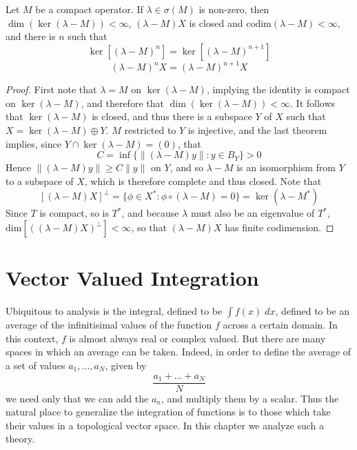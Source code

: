 \begin{corollary}
    Let $M$ be a compact operator. If $\lambda \in \sigma(M)$ is non-zero, then $\dim(\ker(\lambda - M)) < \infty$, $(\lambda - M)X$ is closed and $\text{codim}(\lambda - M) < \infty$, and there is $n$ such that
    \[ \ker[(\lambda - M)^n] = \ker[(\lambda - M)^{n+1}] \]
    \[ (\lambda - M)^n X = (\lambda - M)^{n+1} X \]
\end{corollary}
\begin{proof}
    First note that $\lambda = M$ on $\ker(\lambda - M)$, implying the identity is compact on $\ker(\lambda - M)$, and therefore that $\dim(\ker(\lambda - M)) < \infty$. It follows that $\ker(\lambda - M)$ is closed, and thus there is a subspace $Y$ of $X$ such that $X = \ker(\lambda - M) \oplus Y$. $M$ restricted to $Y$ is injective, and the last theorem implies, since $Y \cap \ker(\lambda - M) = (0)$, that
    \[ C = \inf \{ \| (\lambda - M)y \| : y \in B_Y \} > 0 \]
    Hence $\| (\lambda - M)y \| \geq C \|y\|$ on $Y$, and so $\lambda - M$ is an isomorphism from $Y$ to a subspace of $X$, which is therefore complete and thus closed. Note that
    \[ [(\lambda - M)X]^\perp = \{ \phi \in X^*: \phi \circ (\lambda - M) = 0 \} = \ker( \lambda - M^*) \]
    Since $T$ is compact, so is $T^*$, and because $\lambda$ must also be an eigenvalue of $T^*$, $\text{dim}[((\lambda - M)X)^\perp] < \infty$, so that $(\lambda - M)X$ has finite codimension.
\end{proof}























\chapter{Vector Valued Integration}

Ubiquitous to analysis is the integral, defined to be $\int f(x)\; dx$, defined to be an average of the infinitisimal values of the function $f$ across a certain domain. In this context, $f$ is almost always real or complex valued. But there are many spaces in which an average can be taken. Indeed, in order to define the average of a set of values $a_1, \dots, a_N$, given by
%
\[ \frac{a_1 + \dots + a_N}{N} \]
%
we need only that we can add the $a_n$, and multiply them by a scalar. Thus the natural place to generalize the integration of functions is to those which take their values in a topological vector space. In this chapter we analyze such a theory.

